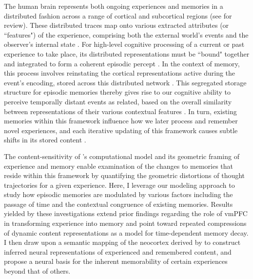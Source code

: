\documentclass{article}
\begin{document}
The human brain represents both ongoing experiences and memories in a distributed fashion across a range of cortical and subcortical regions (see \citealp{RissWagn12} for review).  These distributed traces map onto various extracted attributes (or ``features") of the experience, comprising both the external world's events and the observer's internal state \citep{Tulv72, Bowe72, TulvThom73,Tulv83}.  For high-level cognitive processing of a current or past experience to take place,  its distributed representations must be ``bound" together and integrated to form a coherent episodic percept \citep{Trei96, AshbEtal96, Trei98}.  In the context of memory, this process involves reinstating the cortical representations active during the event's encoding, stored across this distributed network \citep{AlvaSqui94, PolyEtal05a, GelbEtal08, DankAnde10, MannEtal11, Wagn16}.  This segregated storage structure for episodic memories thereby gives rise to our cognitive ability to perceive temporally distant events as related, based on the overall similarity between representations of their various contextual features \citep{AtkiShif68,HowaKaha02a,DianEtal07,SedeEtal08,PolyEtal09,ShanEtal09,ShanHowa10,ShanHowa12,HowaEtal14,Rang18}.  In turn, existing memories within this framework influence how we later process and remember novel experiences, and each iterative updating of this framework causes subtle shifts in its stored content \citep{RaoHowa08}.  

The content-sensitivity of \cite{HeusEtal18c}'s computational model and its geometric framing of experience and memory enable examination of the changes to memories that reside within this framework by quantifying the geometric distortions of thought trajectories for a given experience.  Here, I leverage our modeling approach to study how episodic memories are modulated by various factors including the passage of time and the contextual congruence of existing memories.  Results yielded by these investigations extend prior findings regarding the role of vmPFC in transforming experience into memory and point toward repeated compressions of dynamic content representations as a model for time-dependent memory decay.  I then draw upon a semantic mapping of the neocortex derived by \cite{HuthEtal16} to construct inferred neural representations of experienced and remembered content, and propose a neural basis for the inherent memorability of certain experiences beyond that of others.  


\pagebreak
\end{document}
